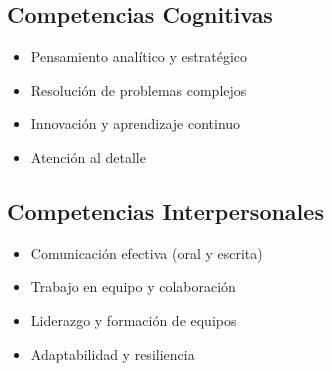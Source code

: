 \documentclass{article}
\begin{document}
\begin{minipage}[t]{0.48\textwidth}
  \subsection{\faBrain\enspace Competencias Cognitivas}
  \begin{itemize}
    \item Pensamiento analítico y estratégico
    \item Resolución de problemas complejos
    \item Innovación y aprendizaje continuo
    \item Atención al detalle
  \end{itemize}
\end{minipage}\hfill
\begin{minipage}[t]{0.48\textwidth}
  \subsection{\faUsers\enspace Competencias Interpersonales}
  \begin{itemize}
    \item Comunicación efectiva (oral y escrita)
    \item Trabajo en equipo y colaboración
    \item Liderazgo y formación de equipos
    \item Adaptabilidad y resiliencia
  \end{itemize}
\end{minipage}

\end{document}
